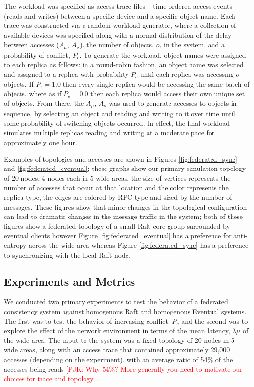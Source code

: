 \documentclass[10pt,conference,compsocconf,letterpaper]{IEEEtran}
\newcommand{\todo}[1]{{\textcolor{red}{#1}}}
\newcommand{\pjk}[1]{[\todo{PJK: #1}]}
\begin{document}
The workload was specified as access trace files -- time ordered access events (reads and writes) between a specific device and a specific object name. Each trace was constructed via a random workload generator, where a collection of available devices was specified along with a normal distribution of the delay between accesses ($A_{\mu}$, $A_{\sigma}$), the number of objects, $o$, in the system, and a probability of conflict, $P_c$. To generate the workload, object names were assigned to each replica as follows: in a round-robin fashion, an object name was selected and assigned to a replica with probability $P_c$ until each replica was accessing $o$ objects. If $P_c = 1.0$ then every single replica would be accessing the same batch of objects, where as if $P_c = 0.0$ then each replica would access their own unique set of objects. From there, the $A_{\mu}$, $A_{\sigma}$ was used to generate accesses to objects in sequence, by selecting an object and reading and writing to it over time until some probability of switching objects occurred. In effect, the final workload simulates multiple replicas reading and writing at a moderate pace for approximately one hour.

Examples of topologies and accesses are shown in Figures \ref{fig:federated_sync} and \ref{fig:federated_eventual}; these graphs show our primary simulation topology of 20 nodes, 4 nodes each in 5 wide areas, the size of vertices represents the number of accesses that occur at that location and the color represents the replica type, the edges are colored by RPC type and sized by the number of messages. These figures show that minor changes in the topological configuration can lead to dramatic changes in the message traffic in the system; both of these figures show a federated topology of a small Raft core group surrounded by eventual clients however Figure \ref{fig:federated_eventual} has a preference for anti-entropy across the wide area whereas Figure \ref{fig:federated_sync} has a preference to synchronizing with the local Raft node.

\subsection{Experiments and Metrics}

We conducted two primary experiments to test the behavior of a federated consistency system against homogenous Raft and homogenous Eventual systems. The first was to test the behavior of increasing conflict, $P_c$ and the second was to explore the effect of the network environment in terms of the mean latency, $\lambda{\mu}$ of the wide area. The input to the system was a fixed topology of 20 nodes in 5 wide areas, along with an access trace that contained approximately 29,000 accesses (depending on the experiment), with an average ratio of 54\% of the accesses being reads \pjk{Why 54\%? More generally you need to motivate our choices for trace and topology.}.
\end{document}
